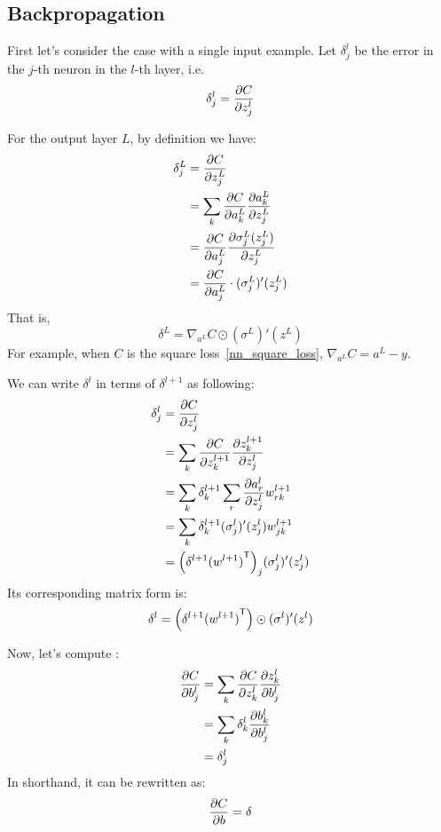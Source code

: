 \subsection{Backpropagation}
First let's consider the case with a single input example. Let $\delta^l_j$ be the error in the $j$-th neuron
in the $l$-th layer, i.e.
\begin{equation}\label{delta_l_j}
    \delta^l_j = \frac{\partial {C}}{\partial {z^l_j}}
\end{equation}

For the output layer $L$, by definition we have:
\begin{align*}
    \delta^L_j &= \frac{\partial {C}}{\partial {z^L_j}}\\
               &= \sum_k \frac{\partial {C}}{\partial {a^L_k}} \frac{\partial {a^L_k}}{\partial {z^L_j}}\\
               &= \frac{\partial {C}}{\partial {a^L_j}} \frac{\partial {\sigma^L_j(z^L_j)}}{\partial {z^L_j}}\\
               &= \frac{\partial {C}}{\partial {a^L_j}}\cdot (\sigma^L_j)'(z^L_j)
\end{align*}
That is,
\begin{equation}
    \delta^L = \nabla_{a^L}C \odot (\sigma^L)'(z^L)
\end{equation}
For example, when $C$ is the square loss~\eqref{nn_square_loss}, $\nabla_{a^L}C = a^L - y$.
\par
We can write $\delta^l$ in terms of $\delta^{l+1}$ as following:
\begin{align*}
    \delta^l_j &= \frac{\partial {C}}{\partial {z^l_j}}\\
               &= \sum_k \frac{\partial {C}}{\partial {z^{l+1}_k}} \frac{\partial {z^{l+1}_k}}{\partial {z^l_j}}\\
               &= \sum_k \delta^{l+1}_k \sum_r \frac{\partial {a^l_r}}{\partial {z^l_j}} w^{l+1}_{rk}\\
               &= \sum_k \delta^{l+1}_k (\sigma^l_j)'(z^l_j) w^{l+1}_{jk}\\
               &= {\left(\delta^{l+1} {(w^{l+1})}^\mathsf{T}\right)}_{j} (\sigma^l_j)'(z^l_j)
\end{align*}
Its corresponding matrix form is:
\begin{equation}
    \delta^l = \left(\delta^{l+1} {(w^{l+1})}^\mathsf{T}\right) \odot (\sigma^l)'(z^l)
\end{equation}

Now, let's compute :
\begin{align*}
    \frac{\partial {C}}{\partial {b^l_j}} &= \sum_k \frac{\partial {C}}{\partial {z^l_k}} \frac{\partial {z^l_k}}{\partial {b^l_j}}\\
                     &= \sum_k \delta^l_k \frac{\partial {b^l_k}}{\partial {b^l_j}}\\
                     &= \delta^l_j
\end{align*}
In shorthand, it can be rewritten as:
\begin{equation}
    \frac{\partial {C}}{\partial {b}} = \delta
\end{equation}

